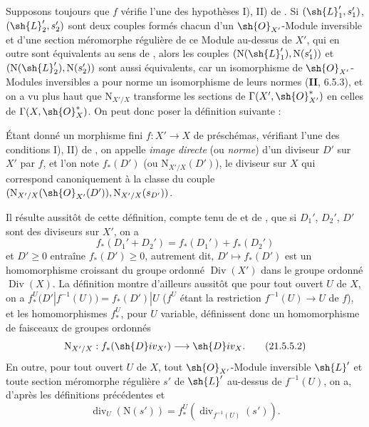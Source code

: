 \begin{env}[21.5.4]
\label{IV.21.5.4}
Supposons toujours que $f$ vérifie l'une des hypothèses I), II) de .
Si $(\sh{L}_1',s_1')$, $(\sh{L}_2',s_2')$ sont deux couples formés chacun d'un $\sh{O}_{X'}$-Module inversible et d'une section méromorphe régulière de ce Module au-dessus de $X'$, qui en outre sont équivalents au sens de , alors les couples $(\mathrm{N}(\sh{L}_1'),\mathrm{N}(s_1'))$ et $(\mathrm{N}(\sh{L}_2'),\mathrm{N}(s_2'))$ sont aussi équivalents, car un isomorphisme de $\sh{O}_{X'}$-Modules inversibles a pour norme un isomorphisme de leurs normes (\textbf{II}, 6.5.3), et on a vu plus haut que $\mathrm{N}_{X'/X}$ transforme les sections de $\Gamma(X',\sh{O}_{X'}^*)$ en celles de $\Gamma(X,\sh{O}_X^*)$.
On peut donc poser la définition suivante :
\end{env}


\begin{definition}[21.5.5]
\label{IV.21.5.5}
Étant donné un morphisme fini $f:X'\to X$ de préschémas, vérifiant l'une des conditions I), II) de , on appelle \emph{image directe} (ou \emph{norme}) d'un diviseur $D'$ sur $X'$ par $f$, et l'on note $f_*(D')$ (ou $\mathrm{N}_{X'/X}(D')$), le diviseur sur $X$ qui correspond canoniquement  à la classe du couple $(\mathrm{N}_{X'/X}(\sh{O}_{X'}(D')),\mathrm{N}_{X'/X}(s_{D'}))$.
\end{definition}

Il résulte aussitôt de cette définition, compte tenu de  et de , que si $D_1'$, $D_2'$, $D'$ sont des diviseurs sur $X'$, on a
\[
\label{IV.21.5.5.1}
  f_*(D_1'+D_2')=f_*(D_1')+f_*(D_2')
  \tag{21.5.5.1}
\]
et $D'\geq0$ entraîne $f_*(D')\geq0$, autrement dit, $D'\mapsto f_*(D')$ est un homomorphisme croissant du groupe ordonné $\operatorname{Div}(X')$ dans le groupe ordonné $\operatorname{Div}(X)$.
La définition  montre d'ailleurs aussitôt que pour tout ouvert $U$ de $X$, on a $f_*^U(D'|f^{-1}(U))=f_*(D')|U$ ($f^U$ étant la restriction $f^{-1}(U)\to U$ de $f$), et les homomorphismes $f_*^U$, pour $U$ variable, définissent donc un homomorphisme de faisceaux de groupes ordonnés
\[
\label{IV.21.5.5.2}
  \mathrm{N}_{X'/X}:f_*(\sh{D}iv_{X'})\to\sh{D}iv_X.
  \tag{21.5.5.2}
\]
En outre, pour tout ouvert $U$ de $X$, tout $\sh{O}_{X'}$-Module inversible $\sh{L}'$ et toute section méromorphe régulière $s'$ de $\sh{L}'$ au-dessus de $f^{-1}(U)$, on a, d'après les définitions précédentes et 
\[
\label{IV.21.5.5.3}
  \operatorname{div}_U(\mathrm{N}(s'))=f_*^U(\operatorname{div}_{f^{-1}(U)}(s')).
  \tag{21.5.5.3}
\]

